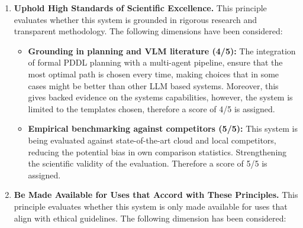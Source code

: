 \begin{enumerate}
    \begin{itemize}
        \item \textbf{Full local execution (5/5):} All models run locally via
        Ollama, no screenshots or screen data are ever sent to external servers nor
        kept in device memory, and the system requires no internet connection to
        operate. This was thought with the privacy by design concept in mind, giving
        this dimension a 5/5.

        \item \textbf{Open-source models (5/5):} The pipeline relies on local models
        from the Whisper, Qwen, and Gemma families. These models can be executed on
        the user's own machine without depending on external inference services.
        This reinforces the privacy guarantees of the system, for this reason, a
        score of 5/5 is assigned.
    \end{itemize}

    \item \textbf{Uphold High Standards of Scientific Excellence.} This principle
    evaluates whether this system is grounded in rigorous research and transparent
    methodology. The following dimensions have been considered:

    \begin{itemize}
        \item \textbf{Grounding in planning and VLM literature (4/5):} The
        integration of formal PDDL planning with a multi-agent pipeline, ensure
        that the most optimal path is chosen every time, making choices that in
        some cases might be better than other LLM based systems. Moreover, this
        gives backed evidence on the systems capabilities, however, the system is
        limited to the templates chosen, therefore a score of 4/5 is assigned.

        \item \textbf{Empirical benchmarking against competitors (5/5):} This
        system is being evaluated against state-of-the-art cloud and local
        competitors, reducing the potential bias in own comparison statistics.
        Strengthening the scientific validity of the evaluation. Therefore a score
        of 5/5 is assigned.
    \end{itemize}

    \item \textbf{Be Made Available for Uses that Accord with These Principles.}
    This principle evaluates whether this system is only made available for uses
    that align with ethical guidelines. The following dimension has been considered:


\end{enumerate}
